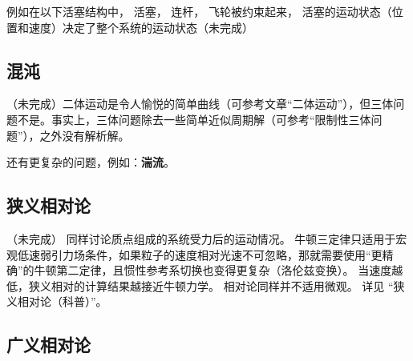 例如在以下活塞结构中， 活塞， 连杆， 飞轮被约束起来， 活塞的运动状态（位置和速度）决定了整个系统的运动状态（未完成）%

\subsection{混沌}
（未完成）二体运动是令人愉悦的简单曲线（可参考文章“二体运动”），但三体问题不是。事实上，三体问题除去一些简单近似周期解（可参考“限制性三体问题”），之外没有解析解。

还有更复杂的问题，例如：\textbf{湍流}。

\subsection{狭义相对论}
（未完成）
同样讨论质点组成的系统受力后的运动情况。 牛顿三定律只适用于宏观低速弱引力场条件，如果粒子的速度相对光速不可忽略，那就需要使用“更精确”的牛顿第二定律，且惯性参考系切换也变得更复杂（洛伦兹变换）。 当速度越低，狭义相对的计算结果越接近牛顿力学。 相对论同样并不适用微观。 详见 “狭义相对论（科普）”。

\subsection{广义相对论}
